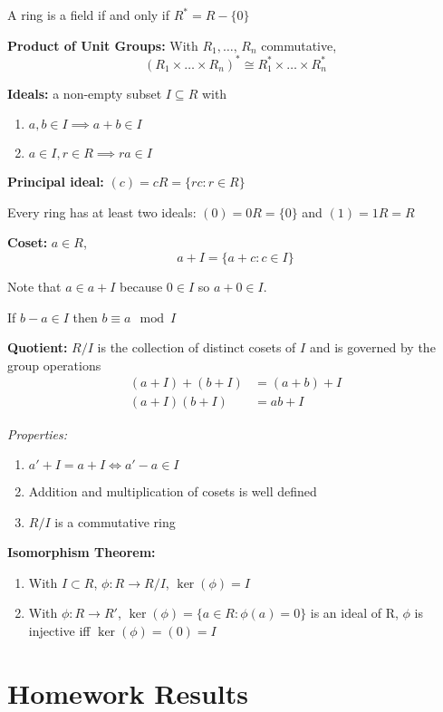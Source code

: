 \documentclass[12pt]{article}
\begin{document}
A ring is a field if and only if $R^* = R - \{0\}$

\textbf{Product of Unit Groups:} With $R_1, \dots,\, R_n$ commutative,
\[(R_1 \times \dots \times R_n)^* \cong R_1^* \times \dots \times R_n^*\]

\textbf{Ideals:} a non-empty subset $I \subseteq R$ with 
\begin{enumerate}
    \item $a, b \in I \implies a + b \in I$
    \item $a \in I, r \in R \implies ra \in I$
\end{enumerate}

\textbf{Principal ideal:} $(c) = cR = \{rc : r\in R\}$

Every ring has at least two ideals: $(0) = 0R = \{0\}$ and $(1) = 1R = R$

\textbf{Coset:} $a \in R$, 
\[a + I = \{a + c : c \in I\}\]

Note that $a \in a + I$ because $0 \in I$ so $a + 0 \in I$. 

If $b - a \in I$ then $b \equiv a \mod I$

\textbf{Quotient:} $R/I$ is the collection of distinct cosets of $I$ and is governed by the group operations 
\begin{align*}
    (a + I) + (b + I) &= (a+b) + I\\ 
    (a + I)(b + I) &= ab + I
\end{align*}

\emph{Properties:}
\begin{enumerate}
    \item $a' + I = a + I \iff a' - a \in I$
    \item Addition and multiplication of cosets is well defined 
    \item $R/I$ is a commutative ring
\end{enumerate}

\textbf{Isomorphism Theorem:} 
\begin{enumerate}
    \item With $I \subset R$, $\phi: R \to R/I$, $\ker(\phi) = I$
    \item With $\phi: R \to R'$, $\ker(\phi) = \{a\in R: \phi(a) = 0\}$ is an ideal of R, $\phi$ is injective iff $\ker(\phi) = (0) = I$
\end{enumerate}

\section*{Homework Results}
\end{document}
